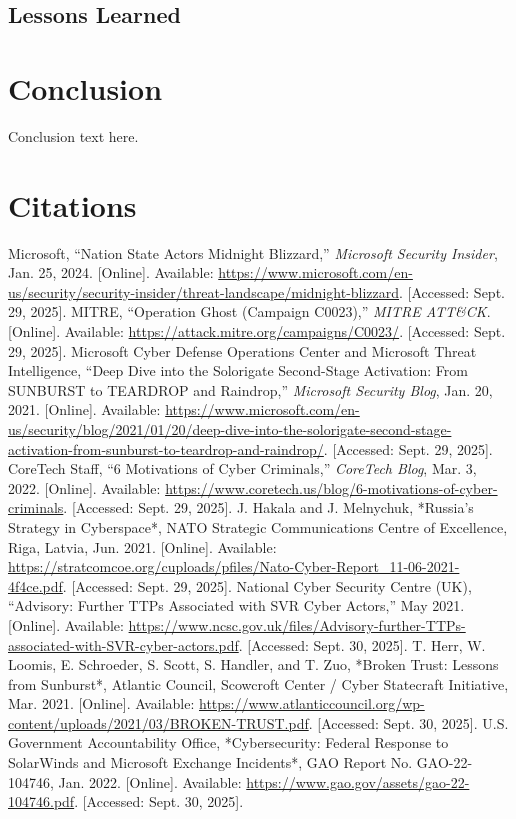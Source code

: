 \documentclass[conference]{IEEEtran}
\begin{document}
\subsection{Lessons Learned}

\section{Conclusion}


Conclusion text here.

\section*{Citations}


\begin{thebibliography}{}
 Microsoft, ``Nation State Actors Midnight Blizzard,'' \emph{Microsoft Security Insider}, Jan. 25, 2024. [Online]. Available: \url{https://www.microsoft.com/en-us/security/security-insider/threat-landscape/midnight-blizzard}. [Accessed: Sept. 29, 2025].
 MITRE, ``Operation Ghost (Campaign C0023),'' \emph{MITRE ATT\&CK}. [Online]. Available: \url{https://attack.mitre.org/campaigns/C0023/}. [Accessed: Sept. 29, 2025].
 Microsoft Cyber Defense Operations Center and Microsoft Threat Intelligence, ``Deep Dive into the Solorigate Second-Stage Activation: From SUNBURST to TEARDROP and Raindrop,'' \emph{Microsoft Security Blog}, Jan. 20, 2021. [Online]. Available: \url{https://www.microsoft.com/en-us/security/blog/2021/01/20/deep-dive-into-the-solorigate-second-stage-activation-from-sunburst-to-teardrop-and-raindrop/}. [Accessed: Sept. 29, 2025].
 CoreTech Staff, ``6 Motivations of Cyber Criminals,'' \emph{CoreTech Blog}, Mar. 3, 2022. [Online]. Available: \url{https://www.coretech.us/blog/6-motivations-of-cyber-criminals}. [Accessed: Sept. 29, 2025].
 J. Hakala and J. Melnychuk, *Russia’s Strategy in Cyberspace*, NATO Strategic Communications Centre of Excellence, Riga, Latvia, Jun. 2021. [Online]. Available: \url{https://stratcomcoe.org/cuploads/pfiles/Nato-Cyber-Report_11-06-2021-4f4ce.pdf}. [Accessed: Sept. 29, 2025].
 National Cyber Security Centre (UK), ``Advisory: Further TTPs Associated with SVR Cyber Actors,'' May 2021. [Online]. Available: \url{https://www.ncsc.gov.uk/files/Advisory-further-TTPs-associated-with-SVR-cyber-actors.pdf}. [Accessed: Sept. 30, 2025].
 T. Herr, W. Loomis, E. Schroeder, S. Scott, S. Handler, and T. Zuo, *Broken Trust: Lessons from Sunburst*, Atlantic Council, Scowcroft Center / Cyber Statecraft Initiative, Mar. 2021. [Online]. Available: \url{https://www.atlanticcouncil.org/wp-content/uploads/2021/03/BROKEN-TRUST.pdf}. [Accessed: Sept. 30, 2025].
 U.S. Government Accountability Office, *Cybersecurity: Federal Response to SolarWinds and Microsoft Exchange Incidents*, GAO Report No. GAO-22-104746, Jan. 2022. [Online]. Available: \url{https://www.gao.gov/assets/gao-22-104746.pdf}. [Accessed: Sept. 30, 2025].
\end{thebibliography}
\end{document}
